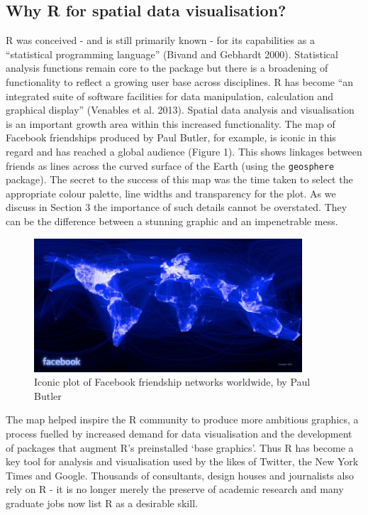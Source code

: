 \documentclass[]{article}
\let\Oldincludegraphics\includegraphics
\renewcommand{\includegraphics}[1]{\Oldincludegraphics[width=10cm]{#1}}
\begin{document}
\subsection{Why R for spatial data visualisation?}

R was conceived - and is still primarily known - for its capabilities as
a ``statistical programming language'' (Bivand and Gebhardt 2000).
Statistical analysis functions remain core to the package but there is a
broadening of functionality to reflect a growing user base across
disciplines. R has become ``an integrated suite of software facilities
for data manipulation, calculation and graphical display'' (Venables et
al. 2013). Spatial data analysis and visualisation is an important
growth area within this increased functionality. The map of Facebook
friendships produced by Paul Butler, for example, is iconic in this
regard and has reached a global audience (Figure 1). This shows linkages
between friends as lines across the curved surface of the Earth (using
the \texttt{geosphere} package). The secret to the success of this map
was the time taken to select the appropriate colour palette, line widths
and transparency for the plot. As we discuss in Section 3 the importance
of such details cannot be overstated. They can be the difference between
a stunning graphic and an impenetrable mess.

\begin{figure}[htbp]
\centering
\includegraphics{figure/butler_facebook_2.jpg}
\caption{Iconic plot of Facebook friendship networks worldwide, by Paul
Butler}
\end{figure}

The map helped inspire the R community to produce more ambitious
graphics, a process fuelled by increased demand for data visualisation
and the development of packages that augment R's preinstalled `base
graphics'. Thus R has become a key tool for analysis and visualisation
used by the likes of Twitter, the New York Times and Google. Thousands
of consultants, design houses and journalists also rely on R - it is no
longer merely the preserve of academic research and many graduate jobs
now list R as a desirable skill.
\end{document}
